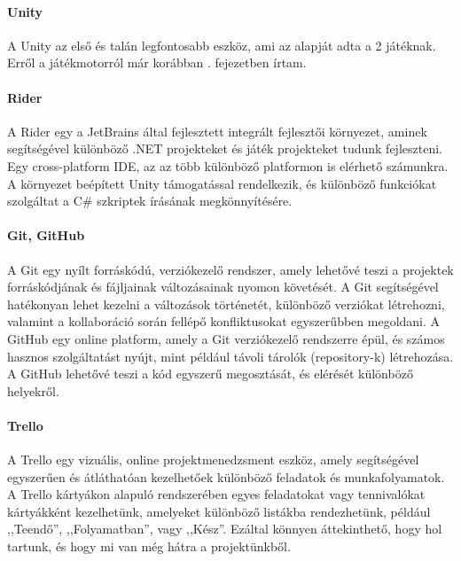 \documentclass[]{thesis-ekf}
\theoremstyle{definition}
\theoremstyle{remark}
\begin{document}
\paragraph{Unity}

A Unity az első és talán legfontosabb eszköz, ami az alapját adta a 2 játéknak. Erről a játékmotorról már korábban . fejezetben írtam.

\paragraph{Rider}

A Rider egy a JetBrains által fejlesztett integrált fejlesztői környezet, aminek segítségével különböző .NET projekteket és játék projekteket tudunk fejleszteni. Egy cross-platform IDE, az az több különböző platformon is elérhető számunkra. A környezet beépített Unity támogatással rendelkezik, és különböző funkciókat szolgáltat a C\# szkriptek írásának megkönnyítésére. \cite{Rider}

\paragraph{Git, GitHub}

A Git egy nyílt forráskódú, verziókezelő rendszer, amely lehetővé teszi a projektek forráskódjának és fájljainak változásainak nyomon követését. A Git segítségével hatékonyan lehet kezelni a változások történetét, különböző verziókat létrehozni, valamint a kollaboráció során fellépő konfliktusokat egyszerűbben megoldani. A GitHub egy online platform, amely a Git verziókezelő rendszerre épül, és számos hasznos szolgáltatást nyújt, mint például távoli tárolók (repository-k) létrehozása. A GitHub lehetővé teszi a kód egyszerű megosztását, és elérését különböző helyekről. \cite{Git} \cite{GitHub}

\paragraph{Trello}

A Trello egy vizuális, online projektmenedzsment eszköz, amely segítségével egyszerűen és átláthatóan kezelhetőek különböző feladatok és munkafolyamatok. A Trello kártyákon alapuló rendszerében egyes feladatokat vagy tennivalókat kártyákként kezelhetünk, amelyeket különböző listákba rendezhetünk, például ,,Teendő'', ,,Folyamatban'', vagy ,,Kész''. Ezáltal könnyen áttekinthető, hogy hol tartunk, és hogy mi van még hátra a projektünkből. \cite{Trello}
\end{document}
